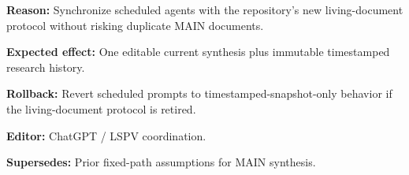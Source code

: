 \documentclass[11pt]{article}
\begin{document}
\textbf{Reason:} Synchronize scheduled agents with the repository's new living-document protocol without risking duplicate MAIN documents.

\textbf{Expected effect:} One editable current synthesis plus immutable timestamped research history.

\textbf{Rollback:} Revert scheduled prompts to timestamped-snapshot-only behavior if the living-document protocol is retired.

\textbf{Editor:} ChatGPT / LSPV coordination.

\textbf{Supersedes:} Prior fixed-path assumptions for MAIN synthesis.
\end{document}
